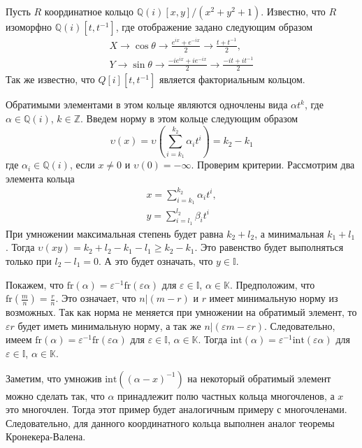 \documentclass[_00_dissertation.tex]{subfiles}
\begin{document}
\begin{example}\label{example:coordinate_ring_of_circle}
    Пусть $R$ координатное кольцо $\mathbb{Q}(i)[x, y]/(x^2 + y^2 + 1)$.
    Известно, что $R$ изоморфно $\mathbb{Q}(i)[t,  t^{-1}]$, где отображение задано следующим образом
    \begin{equation*}
        \begin{split}
            X \to \cos \theta \to \frac{e^{ix} + e^{-ix}}{2} \to \frac{t + t^{-1}}{2},\\
            Y \to \sin \theta \to \frac{-ie^{ix} + ie^{-ix}}{2} \to \frac{-it + it^{-1}}{2}
        \end{split}
    \end{equation*}
    Так же известно, что $Q[i][t, t^{-1}]$ является факториальным кольцом.
    
    Обратимыми элементами в этом кольце  являются одночлены вида $\alpha t^k$, где $\alpha\in\mathbb{Q}(i)$, $k\in\mathbb{Z}$.
    Введем норму в этом кольце следующим образом
    \begin{equation*}
        \upsilon(x) = \upsilon\left(
            \sum_{i=k_1}^{k_2} \alpha_i t^i
        \right) = k_2 - k_1
    \end{equation*}
    где $\alpha_i\in\mathbb{Q}(i)$, если $x \neq 0$ и $\upsilon(0) = -\infty$.
    Проверим критерии.
    Рассмотрим два элемента кольца
    \begin{equation*}
        \begin{split}
            x = \sum_{i=k_1}^{k_2} \alpha_i t^i,\\
            y = \sum_{i=l_1}^{l_2} \beta_i t^i
        \end{split}
    \end{equation*}
    При  умножении максимальная степень будет равна $k_2 + l_2$, а минимальная $k_1 + l_1$.
    Тогда $\upsilon(xy) = k_2 + l_2 - k_1 - l_1 \ge k_2 - k_1$.
    Это равенство будет выполняться только при $l_2 - l_1 = 0$.
    А это будет означать, что $y\in\mathbb{I}$.
    
    Покажем, что $\textrm{fr}(\alpha) = \varepsilon^{-1}\textrm{fr}(\varepsilon\alpha)$ для $\varepsilon\in\mathbb{I}$, $\alpha\in\mathbb{K}$.
    Предположим, что $\textrm{fr}\left(\frac{m}{n}\right) = \frac{r}{n}$.
    Это означает, что $n | (m-r)$ и $r$ имеет минимальную норму из возможных.
    Так как норма не меняется при умножении на обратимый элемент, то $\varepsilon r$ будет иметь минимальную норму, а так же $n | (\varepsilon m - \varepsilon r)$.
    Следовательно, имеем $\textrm{fr}(\alpha) = \varepsilon^{-1}\textrm{fr}(\varepsilon\alpha)$ для $\varepsilon\in\mathbb{I}$, $\alpha\in\mathbb{K}$.
    Тогда $\textrm{int}(\alpha) = \varepsilon^{-1}\textrm{int}(\varepsilon\alpha)$ для $\varepsilon\in\mathbb{I}$, $\alpha\in\mathbb{K}$.
    
    Заметим, что умножив $\textrm{int}((\alpha-x)^{-1})$ на некоторый обратимый элемент можно сделать так, что $\alpha$ принадлежит полю частных кольца многочленов, а $x$ это многочлен.
    Тогда этот пример будет аналогичным примеру с многочленами.
    Следовательно, для данного координатного кольца выполнен аналог теоремы Кронекера-Валена.
\end{example}
\end{document}
